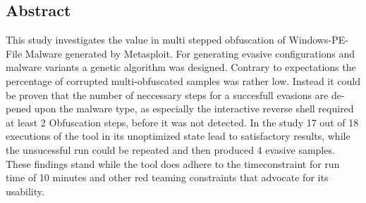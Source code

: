

\begin{otherlanguage}{american}
	\chapter*{Abstract}
    This study investigates the value in multi stepped obfuscation of Windows-PE-File Malware generated by Metasploit. For generating evasive configurations and malware variants a genetic algorithm was designed. Contrary to expectations the percentage of corrupted multi-obfuscated samples was rather low. Instead it could be proven that the number of neccessary steps for a succesfull evasions are depened upon the malware type, as especially the interactive reverse shell required at least 2 Obfuscation steps, before it was not detected. 
    In the study 17 out of 18 executions of the tool in its unoptimized state lead to satisfactory results, while the unsucessful run could be repeated and then produced 4 evasive samples. These findings stand while the tool does adhere to the timeconstraint for run time of 10 minutes and other red teaming constraints that advocate for its usability.
\end{otherlanguage}
